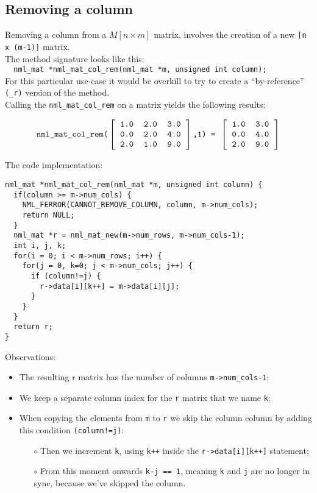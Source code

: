 \subsection{Removing a column}

Removing a column from a $M[n\times m]$ matrix, involves the creation of a new {\tt [n x (m-1)]} matrix.
\\

The method signature looks like this:
\\

\texttt{
 \ nml\_mat *nml\_mat\_col\_rem(nml\_mat *m, unsigned int column);
 }
\\ 

For this particular use-case it would be overkill to try to create a ``by-reference'' {\tt (\_r)} version of the method.
\\

Calling the {\tt nml\_mat\_col\_rem} on a matrix yields the following results:

$$
\texttt{nml\_mat\_col\_rem(}
\left[ \begin{tabular}{rrr}
\tt 1.0 & \tt 2.0 & \tt 3.0 \\
\tt 0.0 & \tt 2.0 & \tt 4.0 \\
\tt 2.0 & \tt 1.0 & \tt 9.0
\end{tabular} \right]
\texttt{,1) = }
\left[ \begin{tabular}{rr}
\tt 1.0 & \tt 3.0 \\
\tt 0.0 & \tt 4.0 \\
\tt 2.0 & \tt 9.0
\end{tabular} \right]
$$

The code implementation:

\begin{verbatim}
nml_mat *nml_mat_col_rem(nml_mat *m, unsigned int column) {
  if(column >= m->num_cols) {
    NML_FERROR(CANNOT_REMOVE_COLUMN, column, m->num_cols);
    return NULL;
  }
  nml_mat *r = nml_mat_new(m->num_rows, m->num_cols-1);
  int i, j, k;
  for(i = 0; i < m->num_rows; i++) {
    for(j = 0, k=0; j < m->num_cols; j++) {
      if (column!=j) {
        r->data[i][k++] = m->data[i][j];
      }
    }
  }
  return r;
}
\end{verbatim}

Observations:

\begin{itemize}
\item The resulting r matrix has the number of columns {\tt m->num\_cols-1};
\item We keep a separate column index for the {\tt r} matrix that we name {\tt k};
\item When copying the elements from {\tt m} to {\tt r} we skip the column column by adding this condition {\tt (column!=j)}:
	\begin{itemize} 
	\item[$\circ$] Then we increment {\tt k}, using {\tt k++} inside the {\tt r->data[i][k++]} statement;
	\item[$\circ$] From this moment onwards {\tt k-j == 1}, meaning {\tt k} and {\tt j} are no longer in sync, because we’ve skipped the column.
	\end{itemize}
\end{itemize}

